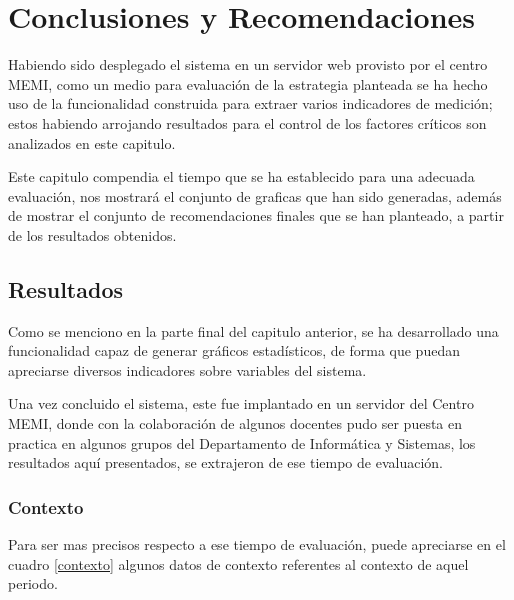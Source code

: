 \chapter{Conclusiones y Recomendaciones}

Habiendo sido desplegado el sistema en un servidor web provisto por el centro
MEMI, como un medio para evaluación de la estrategia planteada se ha hecho uso
de la funcionalidad construida para extraer varios indicadores de medición;
estos habiendo arrojando resultados para el control de los factores críticos son
analizados en este capitulo.

Este capitulo compendia el tiempo que se ha establecido para una adecuada
evaluación, nos mostrará el conjunto de graficas que han sido generadas, además
de mostrar el conjunto de recomendaciones finales que se han planteado, a partir
de los resultados obtenidos.

\section{Resultados}
Como se menciono en la parte final del capitulo anterior, se ha desarrollado una
funcionalidad capaz de generar gráficos estadísticos, de forma que puedan
apreciarse diversos indicadores sobre variables del sistema.

Una vez concluido el sistema, este fue implantado en un servidor del Centro
MEMI, donde con la colaboración de algunos docentes pudo ser puesta en practica
en algunos grupos del Departamento de Informática y Sistemas, los resultados
aquí presentados, se extrajeron de ese tiempo de evaluación.

\subsection{Contexto}
Para ser mas precisos respecto a ese tiempo de evaluación, puede apreciarse en
el cuadro \ref{contexto} algunos datos de contexto referentes al contexto de
aquel periodo.

